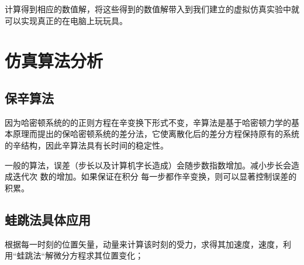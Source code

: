 \documentclass[12pt,a4paper]{ctexart}
\begin{document}
	
	
	\noindent\textbf{}
	计算得到相应的数值解，将这些得到的数值解带入到我们建立的虚拟仿真实验中就可以实现真正的在电脑上玩玩具。
	\clearpage
	\thispagestyle{empty}
	
	
	\section{仿真算法分析}
	\subsection{保辛算法}
	
		因为哈密顿系统的的正则方程在辛变换下形式不变，辛算法是基于哈密顿力学的基本原理而提出的保哈密顿系统的差分法，它使离散化后的差分方程保持原有的系统的辛结构，因此辛算法具有长时间的稳定性。
	
		一般的算法，误差（步长以及计算机字长造成）会随步数指数增加。减小步长会造成迭代次 数的增加。如果保证在积分
	每一步都作辛变换，则可以显著控制误差的积累。
	\subsection{蛙跳法具体应用}
	根据每一时刻的位置矢量，动量来计算该时刻的受力，求得其加速度，速度，利用“蛙跳法“解微分方程求其位置变化；
	\noindent\textbf{}\
	
	
	
	
\end{document}

